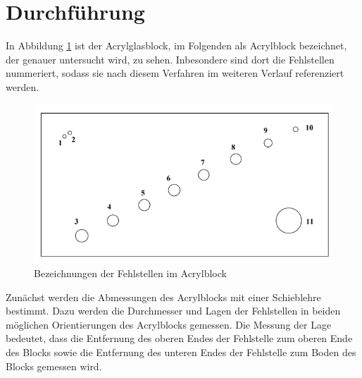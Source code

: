 \section{Durchführung}
\label{sec:Durchführung}
In Abbildung \ref{fig:acrylblock} ist der Acrylglasblock, im Folgenden als Acrylblock bezeichnet,
der genauer untersucht wird, zu sehen. Inbesondere sind dort die Fehlstellen nummeriert, sodass
sie nach diesem Verfahren im weiteren Verlauf referenziert werden.

\begin{figure}
  \centering
  \includegraphics[width=\textwidth]{data/acrylblock.png}
  \caption{Bezeichnungen der Fehlstellen im Acrylblock\,\cite{Versuchsanleitung}}
  \label{fig:acrylblock}
\end{figure}

Zunächst werden die Abmessungen des Acrylblocks mit einer Schieblehre bestimmt.
Dazu werden die Durchmesser und Lagen der Fehlstellen in beiden
möglichen Orientierungen des Acrylblocks gemessen. Die Messung der Lage bedeutet, dass
die Entfernung des oberen Endes der Fehlstelle zum oberen Ende des Blocks sowie die
Entfernung des unteren Endes der Fehlstelle zum Boden des Blocks gemessen wird.

